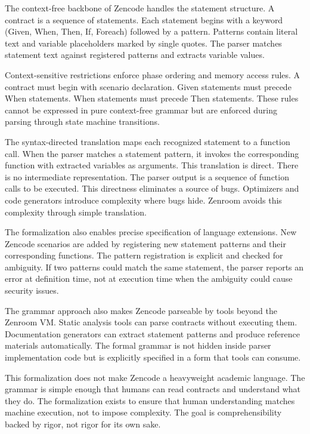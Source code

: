 The context-free backbone of Zencode handles the statement
structure. A contract is a sequence of statements. Each statement
begins with a keyword (Given, When, Then, If, Foreach) followed by a
pattern. Patterns contain literal text and variable placeholders
marked by single quotes. The parser matches statement text against
registered patterns and extracts variable values.

Context-sensitive restrictions enforce phase ordering and memory
access rules. A contract must begin with scenario declaration. Given
statements must precede When statements. When statements must precede
Then statements. These rules cannot be expressed in pure context-free
grammar but are enforced during parsing through state machine
transitions.

The syntax-directed translation maps each recognized statement to a
function call. When the parser matches a statement pattern, it invokes
the corresponding function with extracted variables as arguments. This
translation is direct. There is no intermediate representation. The
parser output is a sequence of function calls to be executed. This
directness eliminates a source of bugs. Optimizers and code generators
introduce complexity where bugs hide. Zenroom avoids this complexity
through simple translation.

The formalization also enables precise specification of language
extensions. New Zencode scenarios are added by registering new
statement patterns and their corresponding functions. The pattern
registration is explicit and checked for ambiguity. If two patterns
could match the same statement, the parser reports an error at
definition time, not at execution time when the ambiguity could cause
security issues.

The grammar approach also makes Zencode parseable by tools beyond the
Zenroom VM. Static analysis tools can parse contracts without
executing them. Documentation generators can extract statement
patterns and produce reference materials automatically. The formal
grammar is not hidden inside parser implementation code but is
explicitly specified in a form that tools can consume.

This formalization does not make Zencode a heavyweight academic
language. The grammar is simple enough that humans can read contracts
and understand what they do. The formalization exists to ensure that
human understanding matches machine execution, not to impose
complexity. The goal is comprehensibility backed by rigor, not rigor
for its own sake.

